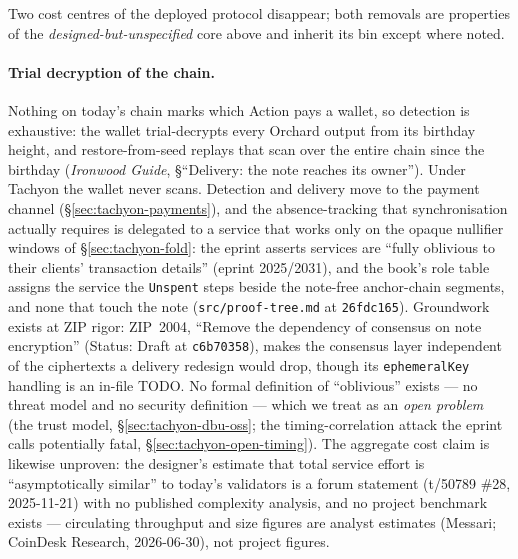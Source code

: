 \documentclass[11pt,a4paper]{article}
\theoremstyle{definition}
\begin{document}
Two cost centres of the deployed protocol disappear; both removals are
properties of the \emph{designed-but-unspecified} core above and inherit its
bin except where noted.

\paragraph{Trial decryption of the chain.} Nothing on today's chain marks
which Action pays a wallet, so detection is exhaustive: the wallet
trial-decrypts every Orchard output from its birthday height, and
restore-from-seed replays that scan over the entire chain since the birthday
(\emph{Ironwood Guide}, \S``Delivery: the note reaches its owner''). Under
Tachyon the wallet never
scans. Detection and delivery move to the payment channel
(\S\ref{sec:tachyon-payments}), and the absence-tracking that
synchronisation actually requires is delegated to a service that works only
on the opaque nullifier windows of \S\ref{sec:tachyon-fold}: the eprint
asserts services are ``fully oblivious to their clients' transaction
details'' (eprint 2025/2031), and the book's role table assigns the service
the \texttt{Unspent} steps beside the note-free anchor-chain segments, and
none that touch the note (\texttt{src/proof-tree.md} at \texttt{26fdc165}).
Groundwork exists at ZIP
rigor: ZIP~2004, ``Remove the dependency of consensus on note encryption''
(Status: Draft at \texttt{c6b70358}), makes the consensus layer independent
of the ciphertexts a delivery redesign would drop, though its
\texttt{ephemeralKey} handling is an in-file TODO. No formal definition of
``oblivious'' exists --- no threat model and no security definition --- which
we treat as an \emph{open problem} (the trust model,
\S\ref{sec:tachyon-dbu-oss}; the timing-correlation attack the eprint calls
potentially fatal, \S\ref{sec:tachyon-open-timing}).
The aggregate cost claim is likewise unproven: the designer's estimate that
total service effort is ``asymptotically similar'' to today's validators is
a forum statement (t/50789 \#28, 2025-11-21) with no published complexity
analysis, and no project benchmark exists --- circulating throughput and
size figures are analyst estimates (Messari; CoinDesk Research, 2026-06-30),
not project figures.
\end{document}

